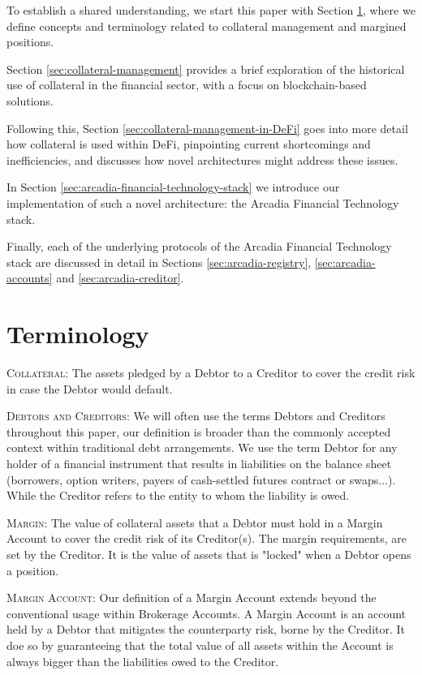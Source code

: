 \documentclass[sigconf,nonacm]{acmart}
\begin{document}
To establish a shared understanding, we start this paper with Section \ref{sec:terminology},
where we define concepts and terminology related to collateral management and margined positions.

Section \ref{sec:collateral-management} provides a brief exploration of the historical use of collateral in the financial sector,
with a focus on blockchain-based solutions.

Following this, Section \ref{sec:collateral-management-in-DeFi} goes into more detail how collateral is used within DeFi,
pinpointing current shortcomings and inefficiencies, and discusses how novel architectures might address these issues.

In Section \ref{sec:arcadia-financial-technology-stack} we introduce our implementation of such a novel architecture:
the Arcadia Financial Technology stack.

Finally, each of the underlying protocols of the Arcadia Financial Technology stack are discussed in detail 
in Sections \ref{sec:arcadia-registry}, \ref{sec:arcadia-accounts} and \ref{sec:arcadia-creditor}.

\section{Terminology}
\label{sec:terminology}
\textsc{Collateral:} The assets pledged by a Debtor to a Creditor to cover the credit risk in case the Debtor would default.

\textsc{Debtors and Creditors:} We will often use the terms Debtors and Creditors throughout this paper,
our definition is broader than the commonly accepted context within traditional debt arrangements.
We use the term Debtor for any holder of a financial instrument that results in liabilities on the balance sheet
(borrowers, option writers, payers of cash-settled futures contract or swaps...).
While the Creditor refers to the entity to whom the liability is owed.

\textsc{Margin:} The value of collateral assets that a Debtor must hold in a Margin Account to cover the credit risk of its Creditor(s).
The margin requirements, are set by the Creditor.
It is the value of assets that is "locked" when a Debtor opens a position.

\textsc{Margin Account:} Our definition of a Margin Account extends beyond the conventional usage within Brokerage Accounts.
A Margin Account is an account held by a Debtor that mitigates the counterparty risk, borne by the Creditor.
It doe so by guaranteeing that the total value of all assets within the Account is always bigger than the liabilities owed to the Creditor.
\end{document}
